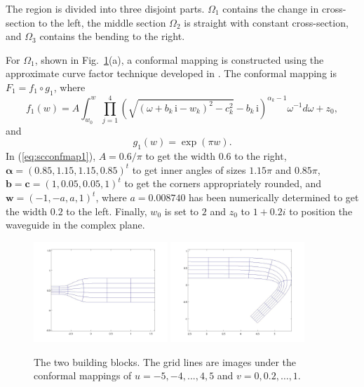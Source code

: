 \documentclass[numreferences]{kluwer}
\renewcommand{\vec}[1]{\bm{#1}}
\renewcommand{\i}{\,\mathrm{i}}
\begin{document}
The region is divided into three disjoint parts. $\Omega_1$ contains
the change in cross-section to the left, the middle section $\Omega_2$
is straight with constant cross-section, and $\Omega_3$ contains the
bending to the right.

For $\Omega_1$, shown in Fig.~\ref{fig:sc}(a), a conformal mapping is
constructed using the approximate curve factor technique developed in
\cite{andersson-acf:2009}. The conformal mapping is $F_1=f_1\circ
g_1$, where
\begin{equation}
  \label{eq:scconfmap1}
  f_1(w)=A\int_{w_0}^w
  \prod_{j=1}^4\left(
    \sqrt{(\omega+b_k\i-w_k)^2-c_k^2}-b_k\i
  \right)^{\alpha_k-1}\omega^{-1}d\omega+z_0,
\end{equation}
and
\begin{equation}
  \label{eq:scconfmap2}
  g_1(w)=\exp(\pi w).
\end{equation}
In (\ref{eq:scconfmap1}), $A=0.6/\pi$ to get the width $0.6$ to the
right, $\vec\alpha=(0.85,1.15,1.15,0.85)^t$ to get inner angles of
sizes $1.15\pi$ and $0.85\pi$, $\vec b=\vec c=(1,0.05,0.05,1)^t$ to
get the corners appropriately rounded, and $\vec w=(-1,-a,a,1)^t$,
where $a=0.008740$ has been numerically determined to get the width
$0.2$ to the left. Finally, $w_0$ is set to $2$ and $z_0$ to $1+0.2i$
to position the waveguide in the complex plane.
\begin{figure}[htb]
  \centering
  \includegraphics[width=0.45\textwidth]{sc}
  \includegraphics[width=0.45\textwidth]{bc}
  \caption{The two building blocks. The grid lines are images under the
    conformal mappings of $u=-5,-4,...,4,5$ and $v=0,0.2,\dots,1$.}
  \label{fig:sc}
\end{figure}
\end{document}
